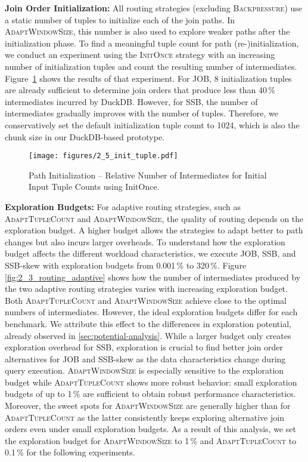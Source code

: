 \textbf{Join Order Initialization:} All routing strategies (excluding \textsc{Backpressure}) use a static number of tuples to initialize each of the join paths. In \textsc{AdaptWindowSize}, this number is also used to explore weaker paths after the initialization phase. To find a meaningful tuple count for path (re-)initialization, we conduct an experiment using the \textsc{InitOnce} strategy with an increasing number of initialization tuples and count the resulting number of intermediates. Figure~\ref{fig:2_5_init_tuple}  shows the results of that experiment. For JOB, 8 initialization tuples are already sufficient to determine join orders that produce less than 40\,\% intermediates incurred by DuckDB. However, for SSB, the number of intermediates gradually improves with the number of tuples. Therefore, we conservatively set the default initialization tuple count to 1024, which is also the chunk size in our DuckDB-based prototype.

\begin{figure}[!t]
    \centering
    \texttt{[image: figures/2\_5\_init\_tuple.pdf]}
		\vspace{-0.5cm}
    \caption{Path Initialization -- Relative Number of Intermediates for Initial Input Tuple Counts using InitOnce.}
    \label{fig:2_5_init_tuple}
		\vspace{-0.5cm}
\end{figure} 

\textbf{Exploration Budgets:} For adaptive routing strategies, such as \textsc{AdaptTupleCount} and \textsc{AdaptWindowSize}, the quality of routing depends on the exploration budget. A higher budget allows the strategies to adapt better to path changes but also incurs larger overheads. To understand how the exploration budget affects the different workload characteristics, we execute JOB, SSB, and SSB-skew with exploration budgets from 0.001\,\% to 320\,\%. Figure \ref{fig:2_3_routing_adaptive} shows how the number of intermediates produced by the two adaptive routing strategies varies with increasing exploration budget. Both \textsc{AdaptTupleCount} and \textsc{AdaptWindowSize} achieve close to the optimal numbers of intermediates. However, the ideal exploration budgets differ for each benchmark. We attribute this effect to the differences in exploration potential, already observed in \ref{sec:potential-analysis}. 
%
While a larger budget only creates exploration overhead for SSB, exploration is crucial to find better join order alternatives for JOB and SSB-skew as the data characteristics change during query execution. \textsc{AdaptWindowSize} is especially sensitive to the exploration budget while \textsc{AdaptTupleCount} shows more robust behavior: small exploration budgets of up to 1\,\% are sufficient to obtain robust performance characteristics. Moreover, the sweet spots for \textsc{AdaptWindowSize} are generally higher than for \textsc{AdaptTupleCount} as the latter consistently keeps exploring alternative join orders even under small exploration budgets. As a result of this analysis, we set the exploration budget for \textsc{AdaptWindowSize} to 1\,\% and \textsc{AdaptTupleCount} to 0.1\,\% for the following experiments.

